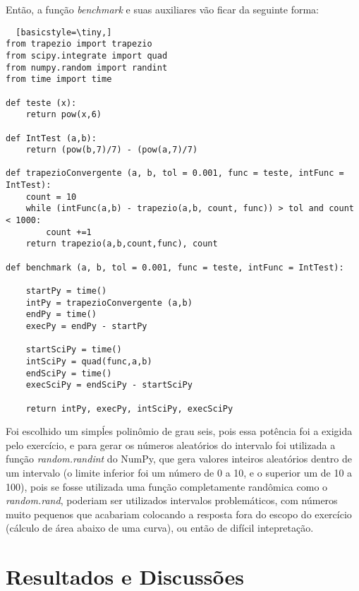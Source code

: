 \documentclass[12pt,A4]{report}
\begin{document}
Então, a função \textit{benchmark} e suas auxiliares vão ficar da seguinte forma:
\begin{lstlisting}  [basicstyle=\tiny,]
from trapezio import trapezio
from scipy.integrate import quad
from numpy.random import randint
from time import time

def teste (x):
    return pow(x,6)

def IntTest (a,b):
    return (pow(b,7)/7) - (pow(a,7)/7)

def trapezioConvergente (a, b, tol = 0.001, func = teste, intFunc = IntTest):
    count = 10
    while (intFunc(a,b) - trapezio(a,b, count, func)) > tol and count < 1000:
        count +=1
    return trapezio(a,b,count,func), count

def benchmark (a, b, tol = 0.001, func = teste, intFunc = IntTest):
    
    startPy = time()
    intPy = trapezioConvergente (a,b)
    endPy = time()
    execPy = endPy - startPy
    
    startSciPy = time()
    intSciPy = quad(func,a,b)
    endSciPy = time()
    execSciPy = endSciPy - startSciPy
    
    return intPy, execPy, intSciPy, execSciPy

\end{lstlisting}

Foi escolhido um simpĺes polinômio de grau seis, pois essa potência foi a exigida pelo exercício, e para gerar os números aleatórios do intervalo foi utilizada a função \textit{random.randint} do NumPy, que gera valores inteiros aleatórios dentro de um intervalo (o limite inferior foi um número de 0 a 10, e o superior um de 10 a 100), pois se fosse utilizada uma função completamente randômica como o \textit{random.rand}, poderiam ser utilizados intervalos problemáticos, com números muito pequenos que acabariam colocando a resposta fora do escopo do exercício (cálculo de área abaixo de uma curva), ou então de difícil intepretação.
\section{Resultados e Discussões}
\end{document}
